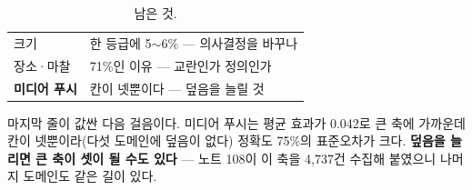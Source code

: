 \documentclass[10pt]{article}
\begin{document}
\begin{table}[t]
\centering\tsize
\caption{남은 것.}
\begin{tabular}{ll}
\toprule
크기 & 한 등급에 5$\sim$6\% --- 의사결정을 바꾸나 \\
장소·마찰 & 71\%인 이유 --- 교란인가 정의인가 \\
\textbf{미디어 푸시} & 칸이 넷뿐이다 --- 덮음을 늘릴 것 \\
\bottomrule
\end{tabular}
\end{table}

마지막 줄이 값싼 다음 걸음이다. 미디어 푸시는 평균 효과가 0.042로 큰 축에
가까운데 칸이 넷뿐이라(다섯 도메인에 덮음이 없다) 정확도 75\%의 표준오차가
크다. \textbf{덮음을 늘리면 큰 축이 셋이 될 수도 있다} --- 노트 108이 이 축을
4,737건 수집해 붙였으니 나머지 도메인도 같은 길이 있다.
\end{document}
